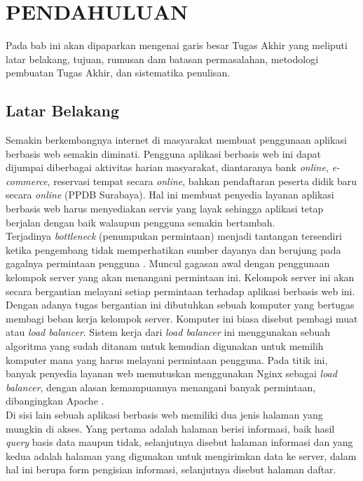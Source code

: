 \documentclass{ta-its}
\begin{document}
    \tableofcontents %
    \listoftables %
    \listoffigures %

\mainmatter %
    \chapter{PENDAHULUAN}
        Pada bab ini akan dipaparkan mengenai garis besar Tugas Akhir yang meliputi latar belakang, tujuan, rumusan dam batasan permasalahan, metodologi pembuatan Tugas Akhir, dan sistematika penulisan.

        \section{Latar Belakang}
            Semakin berkembangnya internet di masyarakat membuat penggunaan aplikasi berbasis web semakin diminati. Pengguna aplikasi berbasis web ini dapat dijumpai diberbagai aktivitas harian masyarakat, diantaranya bank \emph{online}, \emph{e-commerce}, reservasi tempat secara \emph{online}, bahkan pendaftaran peserta didik baru secara \emph{online} (PPDB Surabaya). Hal ini membuat penyedia layanan aplikasi berbasis web harus menyediakan servis yang layak sehingga aplikasi tetap berjalan dengan baik walaupun pengguna semakin bertambah.\\
			\indent Terjadinya \emph{bottleneck} (penumpukan permintaan) menjadi tantangan tersendiri ketika pengembang tidak memperhatikan sumber dayanya dan berujung pada gagalnya permintaan pengguna \cite{paperAlgoritma}. Muncul gagasan awal dengan penggunaan kelompok server yang akan menangani permintaan ini. Kelompok server ini akan secara bergantian melayani setiap permintaan terhadap aplikasi berbasis web ini. Dengan adanya tugas bergantian ini dibutuhkan sebuah komputer yang bertugas membagi beban kerja kelompok server. Komputer ini biasa disebut pembagi muat atau \emph{load balancer}. Sistem kerja dari \emph{load balancer} ini menggunakan sebuah algoritma yang sudah ditanam untuk kemudian digunakan untuk memilih komputer mana yang harus melayani permintaan pengguna. Pada titik ini, banyak penyedia layanan web memutuskan menggunakan Nginx sebagai \textit{load balancer}, dengan alasan kemampuannya menangani banyak permintaan, dibangingkan Apache \cite{quoraNginx}\cite{aosaNginx}. \\
			\indent Di sisi lain sebuah aplikasi berbasis web memiliki dua jenis halaman yang mungkin di akses. Yang pertama adalah halaman berisi informasi, baik hasil \emph{query} basis data maupun tidak, selanjutnya disebut halaman informasi dan yang kedua adalah halaman yang digunakan untuk mengirimkan data ke server, dalam hal ini berupa form pengisian informasi, selanjutnya disebut halaman daftar. \\
\end{document}
